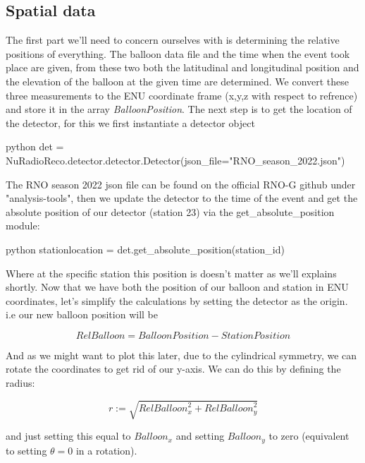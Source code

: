 \documentclass[11pt,a4paper,faculty=we,language=en,doctype=report]{cls/ugent-doc}
\begin{document}
\subsection{Spatial data}
The first part we'll need to concern ourselves with is determining the relative
positions of everything. The balloon data file and the time when the event took
place are given, from these two both the latitudinal and longitudinal position
and the elevation of the balloon at the given time are determined. We convert
these three measurements to the ENU coordinate frame (x,y,z with respect to
refrence) and store it in the array \textit{BalloonPosition}. The next step is
to get the location of the detector, for this we first instantiate a detector
object 

\begin{mintedbox}{python}
det = NuRadioReco.detector.detector.Detector(json_file="RNO_season_2022.json")
\end{mintedbox}

The RNO season 2022 json file can be found on the official RNO-G github under
"analysis-tools", then we update the detector to the time of the event and get
the absolute position of our detector (station 23) via the
get\_absolute\_position module:

\begin{mintedbox}{python}
	stationlocation = det.get_absolute_position(station_id)
\end{mintedbox}

Where at the specific station this position is doesn't matter as we'll explains
shortly.  Now that we have both the position of our balloon and station in ENU
coordinates, let's simplify the calculations by setting the detector as the
origin.  i.e our new balloon position will be

\begin{equation}
	\textit{RelBalloon} = \textit{BalloonPosition} - \textit{StationPosition}
\end{equation}

And as we might want to plot this later, due to the cylindrical symmetry, we
can rotate the coordinates to get rid of our y-axis. We can do this by defining
the radius:

\begin{equation}
	r := \sqrt{\textit{RelBalloon}_x^2 + \textit{RelBalloon}_y^2}
\end{equation}

and just setting this equal to $\textit{Balloon}_x$ and setting $\textit{Balloon}_y$ to
zero (equivalent to setting $\theta= 0$ in a rotation).
\end{document}
